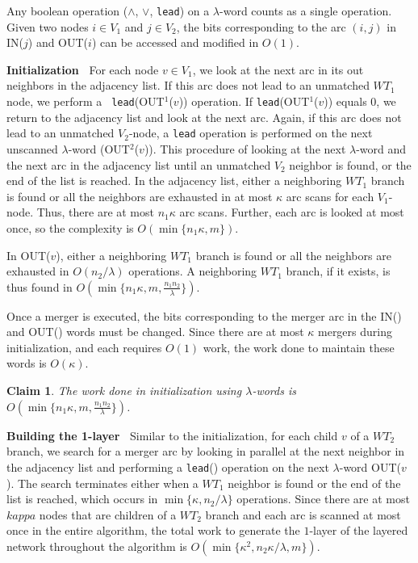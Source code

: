 \documentclass{article}
\newtheorem{claim}{Claim}[section]
\begin{document}
Any boolean operation ($\wedge$, $\vee$, {\tt lead}) on a $\lambda$-word counts as a single operation. Given two nodes $i \in V_1$ and $j \in V_2$, the bits corresponding to the arc $(i,j)$ in IN($j$) and OUT($i$) can be accessed and modified in $O(1)$.

{\bf Initialization~} For each node $v \in V_1$, we look at the next
arc in its out neighbors in the adjacency list. If this arc does not
lead to an unmatched $WT_1$ node, we perform a {\tt
lead}(OUT$^{1}$($v$)) operation. If {\tt lead}(OUT$^{1}$($v$)) equals
0, we return to the adjacency list and look at the next arc. Again, if
this arc does not lead to an unmatched $V_2$-node, a {\tt lead}
operation is performed on the next unscanned $\lambda$-word
(OUT$^{2}$($v$)). This procedure of looking at the next $\lambda$-word
and the next arc in the adjacency list until an unmatched $V_2$
neighbor is found, or the end of the list is reached. In the adjacency
list, either a neighboring $WT_1$ branch is found or all the neighbors
are exhausted in at most $\kappa$ arc scans for each $V_1$-node. Thus,
there are at most $n_1 \kappa$ arc scans. Further, each arc is looked
at most once, so the complexity is $O(\min\{n_1\kappa, m\})$.

In OUT($v$), either a neighboring $WT_1$ branch is found or all the neighbors are exhausted in $O(n_2/\lambda)$ operations. A neighboring $WT_1$ branch, if it exists, is thus found in $O(\min\{n_1\kappa, m, \frac{n_1n_2}{\lambda}\})$.

Once a merger is executed, the bits corresponding to the merger arc in the IN() and OUT() words must be changed. Since there are at most $\kappa$ mergers during initialization, and each requires $O(1)$ work, the work done to maintain these words is $O(\kappa)$.

\begin{claim}
The work done in initialization using $\lambda$-words is $O(\min\{n_1\kappa, m, \frac{n_1n_2}{\lambda}\})$.
\end{claim}

{\bf Building the 1-layer~} Similar to the initialization, for each child $v$ of a $WT_2$ branch, we search for a merger arc by looking in parallel at the next neighbor in the adjacency list and performing a {\tt lead}() operation on the next $\lambda$-word OUT($v$). The search terminates either when a $WT_1$ neighbor is found or the end of the list is reached, which occurs in $\min\{\kappa, n_2/\lambda\}$ operations. Since there are at most $kappa$ nodes that are children of a $WT_2$ branch and each arc is scanned at most once in the entire algorithm, the total work to generate the $1$-layer of the layered network throughout the algorithm is $O(\min\{\kappa^2, n_2\kappa/\lambda, m\})$.
\end{document}
